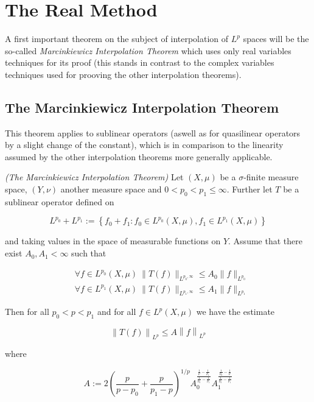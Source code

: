 \section{The Real Method}
A first important theorem on the subject of interpolation of $L^p$ spaces will be the so-called \emph{Marcinkiewicz Interpolation Theorem} which uses only real variables techniques for its proof (this stands in contrast to the complex variables techniques used for prooving the other interpolation theorems).

\subsection{The Marcinkiewicz Interpolation Theorem}
This theorem applies to sublinear operators (aswell as for quasilinear operators by a slight change of the constant), which is in comparison to the linearity assumed by the other interpolation theorems more generally applicable.

\vspace{2mm}

\begin{mdframed}
	\begin{theorem}\emph{(The Marcinkiewicz Interpolation Theorem)}
		Let $(X,\mu)$ be a $\sigma$-finite measure space, $(Y,\nu)$ another measure space and $0 < p_0 < p_1 \leqslant \infty$. Further let $T$ be a sublinear operator defined on
		
		\begin{equation*}
			L^{p_0} + L^{p_1} := \left\{ f_0 + f_1 : f_0 \in L^{p_0}(X,\mu), f_1 \in L^{p_1}(X,\mu) \right\}
		\end{equation*}
		
		and taking values in the space of measurable functions on $Y$. Assume that there exist $A_0,A_1 < \infty$ such that

		\begin{align}
			&\forall f \in L^{p_0}(X,\mu)~\|T(f)\|_{L^{p_0,\infty}} \leqslant A_0 \|f\|_{L^{p_0}}\label{hyp:fp_0}\\
			&\forall f \in L^{p_1}(X,\mu)~\|T(f)\|_{L^{p_1,\infty}} \leqslant A_1 \|f\|_{L^{p_1}}\label{hyp:fp_1}
		\end{align}

		Then for all $p_0 < p < p_1$ and for all $f \in L^p(X,\mu)$ we have the estimate

		\begin{equation}
			\left\|T(f)\right\|_{L^p} \leqslant A \left\|f\right\|_{L^p}
		\end{equation}

		where

		\begin{equation}
			A := 2\left( \frac{p}{p - p_0} + \frac{p}{p_1 - p} \right)^{1/p}A_0^{\frac{\frac{1}{p} - \frac{1}{p_1}}{\frac{1}{p_0}-\frac{1}{p_1}}}A_1^{\frac{\frac{1}{p_0}-\frac{1}{p}}{\frac{1}{p_0}-\frac{1}{p_1}}}
			\label{eq:constant}
		\end{equation}
	\end{theorem}
\end{mdframed}

